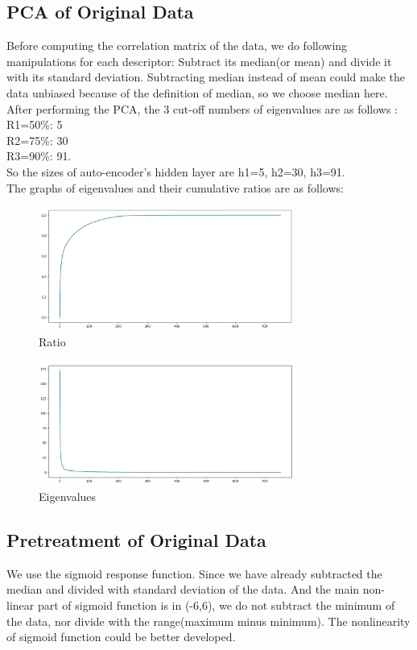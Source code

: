 \documentclass{article}
\begin{document}
 \subsection{PCA of Original Data}Before computing the correlation matrix of the data, we do following manipulations for each descriptor: Subtract its median(or mean) and divide it with its standard deviation. Subtracting median instead of mean could make the data unbiased because of the definition of median, so we choose median here. After performing the PCA, the 3 cut-off numbers of eigenvalues are as follows :\\R1=50\%: 5\\R2=75\%: 30\\R3=90\%: 91. \\So the sizes of auto-encoder's hidden layer are h1=5, h2=30, h3=91.\\
 The graphs of eigenvalues and their cumulative ratios are as follows:
  \begin{figure}[H]
  \centering
  \includegraphics[width=0.75\textwidth]{ratio.jpg}
  \caption{Ratio}\label{}
  \end{figure}
  \begin{figure}[H]
  \centering
  \includegraphics[width=0.75\textwidth]{fracs.jpg}
  \caption{Eigenvalues}\label{}
  \end{figure}
 \subsection{Pretreatment of Original Data}We use the sigmoid response function. Since we have already subtracted the median and divided with standard deviation of the data. And the main non-linear part of sigmoid function is in (-6,6), we do not subtract the minimum of the data, nor divide with the range(maximum minus minimum). The nonlinearity of sigmoid function could be better developed.
\end{document}
